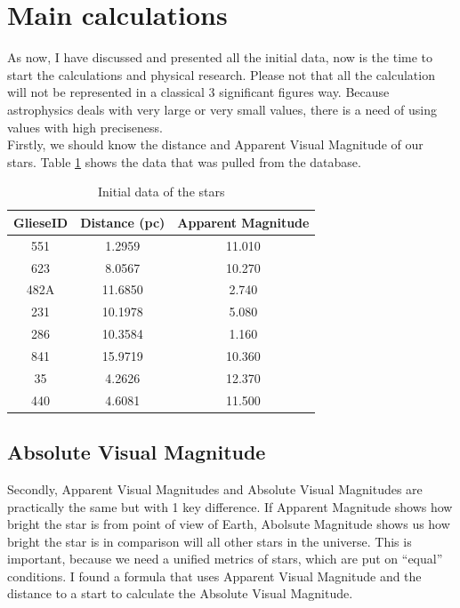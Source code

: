 \documentclass{article}
\begin{document}
  
  
  \section{Main calculations}
  
  As now, I have discussed and presented all the initial data, now is the time to start the calculations and physical research. Please not that all the calculation will not be represented in a classical 3 significant figures way. Because astrophysics deals with very large or very small values, there is a need of using values with high preciseness. \\
  
  Firstly, we should know the distance and Apparent Visual Magnitude of our stars. Table \ref{data} shows the data that was pulled from the database.
  
  \begin{table}[h!]
    \begin{center}
      \caption{Initial data of the stars}
      \begin{tabular}{c | c | c}
        \textbf{GlieseID} & \textbf{Distance (pc)} & \textbf{Apparent Magnitude} \\
        \hline
        551  & 1.2959  & 11.010\\
        623  & 8.0567  & 10.270\\
        482A & 11.6850 & 2.740\\
        231  & 10.1978 & 5.080\\
        286  & 10.3584 & 1.160\\
        841  & 15.9719 & 10.360\\
        35   & 4.2626  & 12.370\\
        440  & 4.6081  & 11.500\\
      \end{tabular}
      \label{data}
    \end{center}
  \end{table}
  
  \subsection{Absolute Visual Magnitude}

  Secondly, Apparent Visual Magnitudes and Absolute Visual Magnitudes are practically the same but with 1 key difference. If Apparent Magnitude shows how bright the star is from point of view of Earth, Abolsute Magnitude shows us how bright the star is in comparison will all other stars in the universe. This is important, because we need a unified metrics of stars, which are put on ``equal'' conditions. I found a formula that uses Apparent Visual Magnitude and the distance to a start to calculate the Absolute Visual Magnitude.
  
\end{document}
